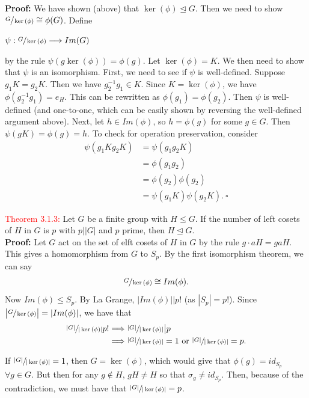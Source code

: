 \documentclass{article}
\begin{document}
\textbf{Proof:} We have shown (above) that $\ker{(\phi)} \trianglelefteq G$. Then we need to show $\sfrac{G}{\ker{(\phi)}} \cong \phi(G)$. 
Define
\begin{center}
    $\psi:\sfrac{G}{\ker{(\phi)}} \longrightarrow Im(G)$
\end{center}
by the rule $\psi(g\ker{(\phi)}) = \phi(g)$. Let $\ker{(\phi)}=K$. We then need to show that $\psi$ is an isomorphism. First, we need to 
see if $\psi$ is well-defined. Suppose $g_1K = g_2K$. Then we have $g_2^{-1}g_1 \in K$. Since $K = \ker{(\phi)}$, we have 
$\phi(g_2^{-1}g_1) = e_H$. This can be rewritten as $\phi(g_1)=\phi(g_2)$. Then $\psi$ is well-defined (and one-to-one, which can be easily 
shown by reversing the well-defined argument above). Next, let $h \in Im(\phi)$, so $h = \phi(g)$ for some $g \in G$. Then $\psi(gK)=\phi(g)=h$. 
To check for operation preservation, consider
\begin{align*}
    \psi(g_1Kg_2K) &= \psi(g_1g_2K) \\
    &= \phi(g_1g_2) \\
    &= \phi(g_2)\phi(g_2) \\
    &= \psi(g_1K)\psi(g_2K). \ \square
\end{align*}

\textcolor{red}{Theorem 3.1.3:} Let $G$ be a finite group with $H \leq G$. If the number of left cosets of $H$ in $G$ is $p$ with 
$p \big| |G|$ and $p$ prime, then $H \trianglelefteq G$.\\
\textbf{Proof:} Let $G$ act on the set of elft cosets of $H$ in $G$ by the rule $g \cdot aH = gaH$. This gives a homomorphism from $G$ to 
$S_p$. By the first isomorphism theorem, we can say
\[
    \sfrac{G}{\ker{(\phi)}} \cong Im(\phi).
\]
Now $Im(\phi) \leq S_p$. By La Grange, $|Im(\phi)| \big| p!$ (as $|S_p|=p!$). Since $\big| \sfrac{G}{\ker{(\phi)}} \big| = |Im(\phi)|$, we 
have that
\begin{align*}
    \sfrac{|G|}{|\ker{(\phi)}|}p! &\Longrightarrow \sfrac{|G|}{|\ker{(\phi)}|} \big| p \\
    &\Longrightarrow \sfrac{|G|}{|\ker{(\phi)}|} = 1 \text{ or } \sfrac{|G|}{|\ker{(\phi)}|} = p.
\end{align*}

If $\sfrac{|G|}{|\ker{(\phi)}|} = 1$, then $G = \ker{(\phi)}$, which would give that $\phi(g) = id_{S_p}$ $\forall g \in G$. But then for 
any $g \notin H$, $gH \neq H$ so that $\sigma_g \neq id_{S_p}$. Then, because of the contradiction, we must have that 
$\sfrac{|G|}{|\ker{(\phi)}|} = p$.
\end{document}
